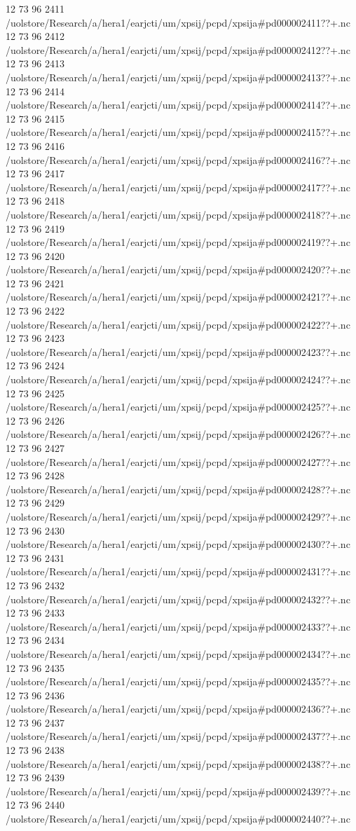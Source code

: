 12 73 96
2411
/uolstore/Research/a/hera1/earjcti/um/xpsij/pcpd/xpsija#pd000002411??+.nc
12 73 96
2412
/uolstore/Research/a/hera1/earjcti/um/xpsij/pcpd/xpsija#pd000002412??+.nc
12 73 96
2413
/uolstore/Research/a/hera1/earjcti/um/xpsij/pcpd/xpsija#pd000002413??+.nc
12 73 96
2414
/uolstore/Research/a/hera1/earjcti/um/xpsij/pcpd/xpsija#pd000002414??+.nc
12 73 96
2415
/uolstore/Research/a/hera1/earjcti/um/xpsij/pcpd/xpsija#pd000002415??+.nc
12 73 96
2416
/uolstore/Research/a/hera1/earjcti/um/xpsij/pcpd/xpsija#pd000002416??+.nc
12 73 96
2417
/uolstore/Research/a/hera1/earjcti/um/xpsij/pcpd/xpsija#pd000002417??+.nc
12 73 96
2418
/uolstore/Research/a/hera1/earjcti/um/xpsij/pcpd/xpsija#pd000002418??+.nc
12 73 96
2419
/uolstore/Research/a/hera1/earjcti/um/xpsij/pcpd/xpsija#pd000002419??+.nc
12 73 96
2420
/uolstore/Research/a/hera1/earjcti/um/xpsij/pcpd/xpsija#pd000002420??+.nc
12 73 96
2421
/uolstore/Research/a/hera1/earjcti/um/xpsij/pcpd/xpsija#pd000002421??+.nc
12 73 96
2422
/uolstore/Research/a/hera1/earjcti/um/xpsij/pcpd/xpsija#pd000002422??+.nc
12 73 96
2423
/uolstore/Research/a/hera1/earjcti/um/xpsij/pcpd/xpsija#pd000002423??+.nc
12 73 96
2424
/uolstore/Research/a/hera1/earjcti/um/xpsij/pcpd/xpsija#pd000002424??+.nc
12 73 96
2425
/uolstore/Research/a/hera1/earjcti/um/xpsij/pcpd/xpsija#pd000002425??+.nc
12 73 96
2426
/uolstore/Research/a/hera1/earjcti/um/xpsij/pcpd/xpsija#pd000002426??+.nc
12 73 96
2427
/uolstore/Research/a/hera1/earjcti/um/xpsij/pcpd/xpsija#pd000002427??+.nc
12 73 96
2428
/uolstore/Research/a/hera1/earjcti/um/xpsij/pcpd/xpsija#pd000002428??+.nc
12 73 96
2429
/uolstore/Research/a/hera1/earjcti/um/xpsij/pcpd/xpsija#pd000002429??+.nc
12 73 96
2430
/uolstore/Research/a/hera1/earjcti/um/xpsij/pcpd/xpsija#pd000002430??+.nc
12 73 96
2431
/uolstore/Research/a/hera1/earjcti/um/xpsij/pcpd/xpsija#pd000002431??+.nc
12 73 96
2432
/uolstore/Research/a/hera1/earjcti/um/xpsij/pcpd/xpsija#pd000002432??+.nc
12 73 96
2433
/uolstore/Research/a/hera1/earjcti/um/xpsij/pcpd/xpsija#pd000002433??+.nc
12 73 96
2434
/uolstore/Research/a/hera1/earjcti/um/xpsij/pcpd/xpsija#pd000002434??+.nc
12 73 96
2435
/uolstore/Research/a/hera1/earjcti/um/xpsij/pcpd/xpsija#pd000002435??+.nc
12 73 96
2436
/uolstore/Research/a/hera1/earjcti/um/xpsij/pcpd/xpsija#pd000002436??+.nc
12 73 96
2437
/uolstore/Research/a/hera1/earjcti/um/xpsij/pcpd/xpsija#pd000002437??+.nc
12 73 96
2438
/uolstore/Research/a/hera1/earjcti/um/xpsij/pcpd/xpsija#pd000002438??+.nc
12 73 96
2439
/uolstore/Research/a/hera1/earjcti/um/xpsij/pcpd/xpsija#pd000002439??+.nc
12 73 96
2440
/uolstore/Research/a/hera1/earjcti/um/xpsij/pcpd/xpsija#pd000002440??+.nc

